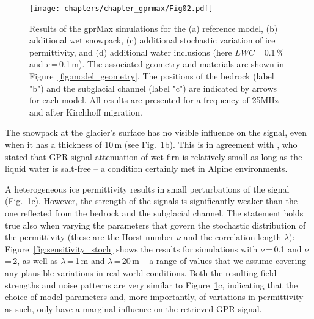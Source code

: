 \begin{figure}
    \centering
    \texttt{[image: chapters/chapter\_gprmax/Fig02.pdf]}
    \caption{Results of the gprMax simulations for the (a) reference model, (b) additional wet snowpack, (c) additional stochastic variation of ice permittivity, and (d) additional water inclusions (here $LWC$\,=\,0.1\,\% and $r$\,=\,0.1\,m). The associated geometry and materials are shown in Figure~\ref{fig:model_geometry}. The positions of the bedrock (label "b") and the subglacial channel (label "c") are indicated by arrows for each model. All results are presented for a frequency of 25MHz and after Kirchhoff migration.}
    \label{fig:model_ref_results}
\end{figure}

The snowpack at the glacier's surface has no visible influence on the signal, even when it has a thickness of 10\,m (see Fig.~\ref{fig:model_ref_results}b). This is in agreement with \cite{Smith&Evans1972}, who stated that GPR signal attenuation of wet firn is relatively small as long as the liquid water is salt-free -- a condition certainly met in Alpine environments. 

A heterogeneous ice permittivity results in small perturbations of the signal (Fig.~\ref{fig:model_ref_results}c). However, the strength of the signals is significantly weaker than the one reflected from the bedrock and the subglacial channel. The statement holds true also when varying the parameters that govern the stochastic distribution of the permittivity (these are the Horst number $\nu$ and the correlation length $\lambda$): Figure~\ref{fig:sensitivity_stoch} shows the results for simulations with $\nu$\,=\,0.1 and $\nu$\,=\,2, as well as $\lambda$\,=\,1\,m and $\lambda$\,=\,20\,m -- a range of values that we assume covering any plausible variations in real-world conditions. Both the resulting field strengths and noise patterns are very similar to Figure~\ref{fig:model_ref_results}c, indicating that the choice of model parameters and, more importantly, of variations in permittivity as such, only have a marginal influence on the retrieved GPR signal. 

